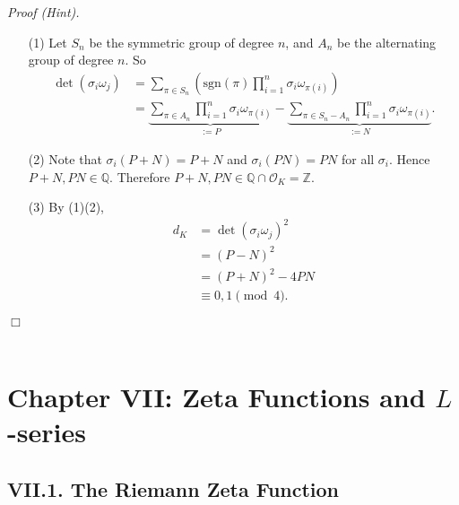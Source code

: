 \documentclass{article}
\begin{document}
\emph{Proof (Hint).}
\begin{enumerate}
\item[(1)]
  Let $S_n$ be the symmetric group of degree $n$, and
  $A_n$ be the alternating group of degree $n$.
  So
  \begin{align*}
    \det(\sigma_i \omega_j)
    &= \sum_{\pi \in S_n}
      \left( \mathrm{sgn}(\pi) \prod_{i=1}^{n} \sigma_i \omega_{\pi(i)} \right) \\
    &= \underbrace{\sum_{\pi \in A_n} \prod_{i=1}^{n} \sigma_i \omega_{\pi(i)}}_{:= P}
      - \underbrace{\sum_{\pi \in S_n - A_n} \prod_{i=1}^{n} \sigma_i \omega_{\pi(i)}}_{:= N}.
  \end{align*}

\item[(2)]
  Note that $\sigma_i(P+N) = P+N$ and $\sigma_i(PN) = PN$ for all $\sigma_i$.
  Hence $P+N, PN \in \mathbb{Q}$.
  Therefore $P+N, PN \in \mathbb{Q} \cap \mathcal{O}_K = \mathbb{Z}$.

\item[(3)]
  By (1)(2),
  \begin{align*}
    d_K
    &= \det(\sigma_i \omega_j)^2 \\
    &= (P-N)^2 \\
    &= (P+N)^2 - 4PN \\
    &\equiv 0, 1 \pmod 4.
  \end{align*}
\end{enumerate}
$\Box$ \\\\






\newpage
\section*{Chapter VII: Zeta Functions and $L$-series \\}



\subsection*{VII.1. The Riemann Zeta Function \\}
\end{document}
